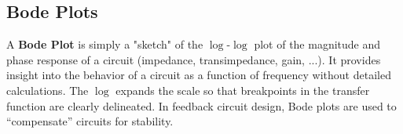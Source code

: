 \subsection{Bode Plots}
A \textbf{Bode Plot} is simply a "sketch" of the $\log$-$\log$ plot of the magnitude and phase response of a circuit (impedance, transimpedance, gain, ...).  It provides insight into the behavior of a circuit as a function of frequency without detailed calculations.  The $\log$ expands the scale so that breakpoints in the transfer function are clearly delineated.  In feedback circuit design, Bode plots are used to “compensate” circuits for stability.
